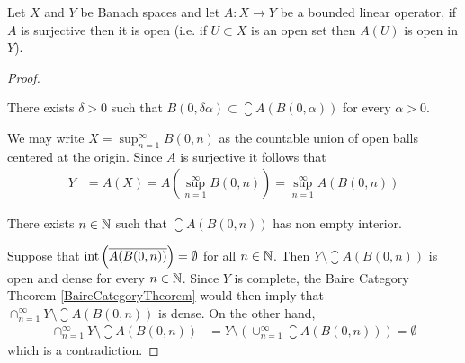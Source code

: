 \begin{thm}\label{banach:OpenMappingTheorem}Let $X$ and $Y$ be Banach spaces and let $A : X \to Y$ be a bounded linear operator, if $A$ is surjective then it is open (i.e. if $U \subset X$ is an open set then $A(U)$ is open in $Y$).
\end{thm}
\begin{proof}
\begin{clm}There exists $\delta > 0$ such that $B(0,\delta \alpha) \subset \closure{A(B(0,\alpha))}$ for every $\alpha > 0$.
\end{clm}
We may write $X = \sup_{n=1}^\infty B(0, n)$ as the countable union of open balls centered at the origin.  Since $A$ is surjective it follows that
\begin{align*}
Y &= A(X) = A(\sup_{n=1}^\infty B(0, n)) = \sup_{n=1}^\infty A(B(0, n))
\end{align*}

\begin{clm}There exists $n \in \mathbb{N}$ such that $\closure{A(B(0, n))}$ has non empty interior.
\end{clm}
Suppose that $\operatorname*{int} \left( \overline{A(B(0, n))} \right) = \emptyset$ for all $n \in \mathbb{N}$.  Then $Y \setminus \closure{A(B(0, n))}$ is open and dense for every $n \in \mathbb{N}$.  Since $Y$ is complete,  the Baire Category Theorem \ref{BaireCategoryTheorem} would then imply that $\cap_{n=1}^\infty Y \setminus \closure{A(B(0, n))}$ is dense.  On the other hand,
\begin{align*}
\cap_{n=1}^\infty Y \setminus \closure{A(B(0, n))} &= Y \setminus \left( \cup_{n=1}^\infty \closure{A(B(0, n))} \right) = \emptyset
\end{align*}
which is a contradiction.


\end{proof}

